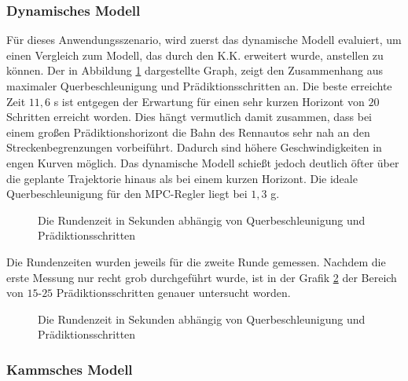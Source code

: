 \documentclass{like}
\begin{document}
\subsubsection{Dynamisches Modell}
Für dieses Anwendungsszenario, wird zuerst das dynamische Modell evaluiert, um einen Vergleich zum Modell, das durch den \ac{K.K.} erweitert wurde, anstellen zu können.
Der in Abbildung \ref{fig:betaMaxN} dargestellte Graph, zeigt den Zusammenhang aus maximaler Querbeschleunigung und Prädiktionsschritten an. Die beste erreichte Zeit $11,6$ s ist entgegen der Erwartung für einen sehr kurzen Horizont von $20$ Schritten erreicht worden. Dies hängt vermutlich damit zusammen, dass bei einem großen Prädiktionshorizont die Bahn des Rennautos sehr nah an den Streckenbegrenzungen vorbeiführt. Dadurch sind höhere Geschwindigkeiten in engen Kurven möglich. Das dynamische Modell schießt jedoch deutlich öfter über die geplante Trajektorie hinaus als bei einem kurzen Horizont. Die ideale Querbeschleunigung für den \ac{MPC}-Regler liegt bei $1,3$ g.  
\begin{figure}
	\centering
	 
	\caption{Die Rundenzeit in Sekunden abhängig von Querbeschleunigung und Prädiktionsschritten}
	\label{fig:betaMaxN}
\end{figure}


Die Rundenzeiten wurden jeweils für die zweite Runde gemessen.
Nachdem die erste Messung nur recht grob durchgeführt wurde, ist in der Grafik \ref{fig:betaMaxFine} der Bereich von $15$-$25$ Prädiktionsschritten genauer untersucht worden.

\begin{figure}
	\centering
	 
	\caption{Die Rundenzeit in Sekunden abhängig von Querbeschleunigung und Prädiktionsschritten}
	\label{fig:betaMaxFine}
\end{figure}

\subsubsection{Kammsches Modell}
\end{document}
